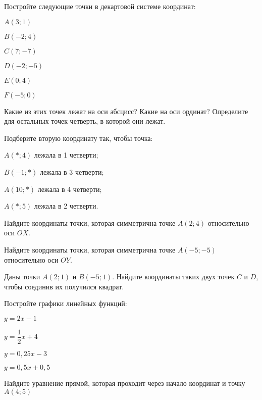 \begin{listofex}
	\item Постройте следующие точки в декартовой системе координат:
	\begin{enumcols}[itemcolumns=3]
		\item \( A(3;1) \)
		\item \( B(-2;4) \)
		\item \( C(7;-7) \)
		\item \( D(-2;-5) \)
		\item \( E(0;4) \)
		\item \( F(-5;0) \)
	\end{enumcols}
	Какие из этих точек лежат на оси абсцисс? Какие на оси ординат? Определите для остальных точек четверть, в которой они лежат.
	\item Подберите вторую координату так, чтобы точка:
	\begin{enumcols}[itemcolumns=1]
		\item \( A(*;4) \) лежала в 1 четверти;
		\item \( B(-1;*) \) лежала в 3 четверти;
		\item \( A(10;*) \) лежала в 4 четверти;
		\item \( A(*;5) \) лежала в 2 четверти.
	\end{enumcols}
	\item Найдите координаты точки, которая симметрична точке \( A(2;4) \) относительно оси \( OX \).
	\item Найдите координаты точки, которая симметрична точке \( A(-5;-5) \) относительно оси \( OY \).
	\item Даны точки \( A(2;1) \) и \( B(-5;1) \). Найдите координаты таких двух точек \( C \) и \( D \), чтобы соединив их получился квадрат.
	\item Постройте графики линейных функций:
	\begin{enumcols}[itemcolumns=2]
		\item \( y=2x-1 \)
		\item \( y=\dfrac{1}{2}x+4 \)
		\item \( y=0,25x-3 \)
		\item \( y=0,5x+0,5 \)
	\end{enumcols}
	\item Найдите уравнение прямой, которая проходит через начало координат и точку \( A(4;5) \)
\end{listofex}
